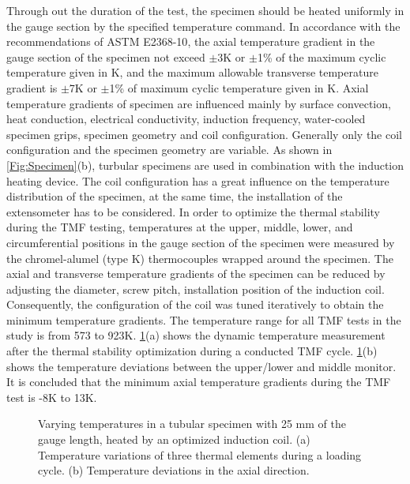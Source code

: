 Through out the duration of the test, the specimen should be heated uniformly in the gauge section by the specified temperature command. In accordance with the recommendations of ASTM E2368-10\cite{ASTME2005}, the axial temperature gradient in the gauge section of the specimen not exceed $\pm$3K or $\pm$1\% of the
maximum cyclic temperature given in K, and the maximum allowable transverse temperature gradient is $\pm$7K or $\pm$1\% of maximum cyclic temperature given in K.
Axial temperature gradients of specimen are influenced mainly by surface convection, heat conduction, electrical conductivity, induction frequency, water-cooled specimen grips, specimen geometry and coil configuration. Generally only the coil configuration and the specimen geometry are variable. As shown in \ref{Fig:Specimen}(b), turbular specimens are used in combination with the induction heating device. The coil configuration has a great influence on the temperature distribution of the specimen, at the same time, the installation of the extensometer has to be considered\cite{Hahner2006}. 
In order to optimize the thermal stability during the TMF testing, temperatures at the upper, middle, lower, and circumferential positions in the gauge section of the specimen were measured by the chromel-alumel (type K) thermocouples wrapped around the specimen.
The axial and transverse temperature gradients of the specimen can be reduced by adjusting the diameter, screw pitch, installation position of the induction coil.
Consequently, the configuration of the coil was tuned iteratively to obtain the minimum temperature gradients. The temperature range for all TMF tests in the study is from 573 to 923K. \ref{Fig:thermal_stability}(a) shows the dynamic temperature measurement after the thermal stability optimization during a conducted TMF cycle. \ref{Fig:thermal_stability}(b) shows the temperature
deviations between the upper/lower and middle monitor. It is concluded that the minimum axial temperature gradients during the TMF test is -8K to 13K. 
\begin{figure}
\caption{Varying temperatures in a tubular specimen with 25 mm of the gauge length, heated by an optimized induction coil. (a) Temperature variations of three thermal elements during a loading cycle. (b) Temperature deviations in the axial direction.}
\label{Fig:thermal_stability}
\end{figure}

